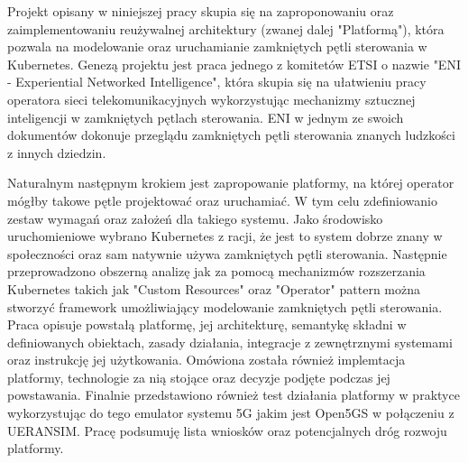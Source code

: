 Projekt opisany w niniejszej pracy skupia się na zaproponowaniu oraz zaimplementowaniu reużywalnej architektury (zwanej dalej "Platformą"), która pozwala na modelowanie oraz uruchamianie zamkniętych pętli sterowania w Kubernetes. Genezą projektu jest praca jednego z komitetów ETSI o nazwie "ENI - Experiential Networked Intelligence", która skupia się na ułatwieniu pracy operatora sieci telekomunikacyjnych wykorzystując mechanizmy sztucznej inteligencji w zamkniętych pętlach sterowania. ENI w jednym ze swoich dokumentów dokonuje przeglądu zamkniętych pętli sterowania znanych ludzkości z innych dziedzin. 

Naturalnym następnym krokiem jest zapropowanie platformy, na której operator mógłby takowe pętle projektować oraz uruchamiać. W tym celu zdefiniowanio zestaw wymagań oraz założeń dla takiego systemu. Jako środowisko uruchomieniowe wybrano  Kubernetes z racji, że jest to system dobrze znany w społeczności oraz sam natywnie używa zamkniętych pętli sterowania. Następnie przeprowadzono obszerną analizę jak za pomocą mechanizmów rozszerzania Kubernetes takich jak "Custom Resources" oraz "Operator" pattern można stworzyć framework umożliwiający modelowanie zamkniętych pętli sterowania. Praca opisuje powstałą platformę, jej architekturę, semantykę składni w definiowanych obiektach, zasady działania, integracje z zewnętrznymi systemami oraz instrukcję jej użytkowania. Omówiona została również implemtacja platformy, technologie za nią stojące oraz decyzje podjęte podczas jej powstawania. Finalnie przedstawiono również test działania platformy w praktyce wykorzystując do tego emulator systemu 5G jakim jest Open5GS w połączeniu z UERANSIM. Pracę podsumuję lista wniosków oraz potencjalnych dróg rozwoju platformy. 
